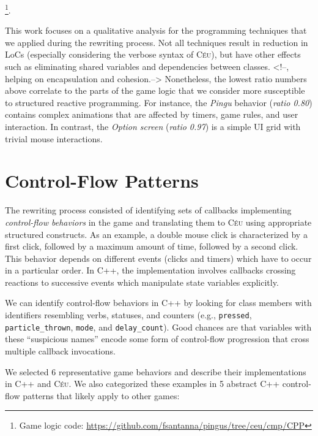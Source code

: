 \documentclass{vgtc}                          %
\newcommand{\CEU}{\textsc{C\'{e}u}\xspace}
\newcommand{\code}[1] {{\small{\texttt{#1}}}}
\begin{document}
\footnote{ Game logic code: \url{https://github.com/fsantanna/pingus/tree/ceu/cmp/CPP} }.

This work focuses on a qualitative analysis for the programming techniques
that we applied during the rewriting process.
Not all techniques result in reduction in LoCs (especially considering the
verbose syntax of \CEU), but have other effects such as eliminating shared
variables and dependencies between classes.
<!--, helping on encapsulation and cohesion.-->
Nonetheless, the lowest ratio numbers above correlate to the parts of the game
logic that we consider more susceptible to structured reactive programming.
For instance, the \emph{Pingu} behavior (\emph{ratio 0.80}) contains complex
animations that are affected by timers, game rules, and user interaction.
In contrast, the \emph{Option screen} (\emph{ratio 0.97}) is a simple UI grid
with trivial mouse interactions.

\section{Control-Flow Patterns}

The rewriting process consisted of identifying sets of callbacks implementing
\emph{control-flow behaviors} in the game and translating them to \CEU using
appropriate structured constructs.
As an example, a double mouse click is characterized by a first click, followed
by a maximum amount of time, followed by a second click.
This behavior depends on different events (clicks and timers) which have to
occur in a particular order.
In C++, the implementation involves callbacks crossing reactions to successive
events which manipulate state variables explicitly.

We can identify control-flow behaviors in C++ by looking for class members with
identifiers resembling verbs, statuses, and counters (e.g.,
\code{pressed},
\code{particle\_thrown},
\code{mode}, and
\code{delay\_count}).
Good chances are that variables with these ``suspicious names'' encode some
form of control-flow progression that cross multiple callback invocations.

We selected 6 representative game behaviors and describe their
implementations in C++ and \CEU.
We also categorized these examples in 5 abstract C++ control-flow patterns that
likely apply to other games:
\end{document}
